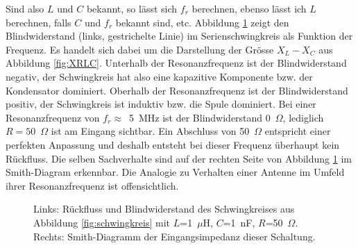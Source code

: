 \documentclass[twoside,a4paper,11pt,halfparskip,DIV=11,notitlepage]{scrartcl}
\newcommand{\uline}[1]{%
    \tikz[baseline=(todotted.base)]{
        \node[inner sep=1pt,outer sep=0pt] (todotted) {#1};
        \draw[color=HB9UFblue,thick] (todotted.south west) -- (todotted.south east);
    }%
}%
\newcommand{\udash}[1]{%
    \tikz[baseline=(todotted.base)]{
        \node[inner sep=1pt,outer sep=0pt] (todotted) {#1};
        \draw[dashed,color=HB9UFred,thick] (todotted.south west) -- (todotted.south east);
    }%
}%
\begin{document}
Sind also $L$ und $C$ bekannt, so lässt sich $f_r$ berechnen, ebenso lässt ich
$L$ berechnen, falls $C$ und $f_r$ bekannt sind, etc. Abbildung \ref{fig:resonanzplot}
zeigt den Blindwiderstand (links, gestrichelte Linie) im Serienschwingkreis als Funktion der Frequenz. Es
handelt sich dabei um die Darstellung der Grösse $X_L-X_C$ aus Abbildung \ref{fig:XRLC}.
Unterhalb der Resonanzfrequenz ist der Blindwiderstand negativ, der
Schwingkreis hat also eine kapazitive Komponente bzw. der Kondensator
dominiert. Oberhalb der Resonanzfrequenz ist der Blindwiderstand positiv, der
Schwingkreis ist induktiv bzw. die Spule dominiert. Bei einer Resonanzfrequenz
von $f_r\approx$~5~MHz ist der Blindwiderstand 0~$\Omega$, lediglich $R=50$~$\Omega$
ist am Eingang sichtbar. Ein Abschluss von 50~$\Omega$ entspricht einer perfekten
Anpassung und deshalb entsteht bei dieser Frequenz überhaupt kein Rückfluss.
Die selben Sachverhalte sind auf der rechten Seite von Abbildung
\ref{fig:resonanzplot} im Smith-Diagram erkennbar. Die Analogie zu Verhalten
einer Antenne im Umfeld ihrer Resonanzfrequenz ist offensichtlich.
\begin{figure}
\begin{center}
\hfill
{}\end{center}
\caption{Links: Rückfluss und Blindwiderstand des Schwingkreises aus Abbildung \ref{fig:schwingkreis} mit 
$L$=1~$\mu$H, $C$=1~nF, $R$=50~$\Omega$. Rechts: Smith-Diagramm der Eingangsimpedanz dieser Schaltung.}
\label{fig:resonanzplot}
\end{figure}
\end{document}
